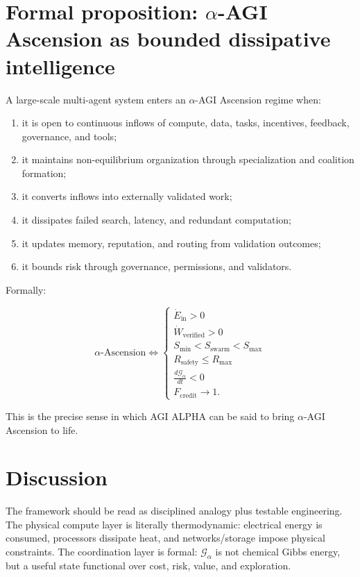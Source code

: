 \documentclass[
  11pt,
]{article}
\providecommand{\tightlist}{%
  \setlength{\itemsep}{0pt}\setlength{\parskip}{0pt}}
\begin{document}
\section{Formal proposition: \texorpdfstring{$\alpha$}{alpha}-AGI Ascension as bounded dissipative
intelligence}\label{formal-proposition-alpha-agi-ascension-as-bounded-dissipative-intelligence}

A large-scale multi-agent system enters an $\alpha$-AGI Ascension regime when:

\begin{enumerate}
\def\labelenumi{\arabic{enumi}.}
\tightlist
\item
  it is open to continuous inflows of compute, data, tasks, incentives,
  feedback, governance, and tools;
\item
  it maintains non-equilibrium organization through specialization and
  coalition formation;
\item
  it converts inflows into externally validated work;
\item
  it dissipates failed search, latency, and redundant computation;
\item
  it updates memory, reputation, and routing from validation outcomes;
\item
  it bounds risk through governance, permissions, and validators.
\end{enumerate}

Formally:

\[
\alpha\text{-Ascension}
\iff
\begin{cases}
\dot{E}_{\text{in}}>0 \\
\dot{W}_{\text{verified}}>0 \\
S_{\min}<S_{\text{swarm}}<S_{\max} \\
R_{\text{safety}}\leq R_{\max} \\
\frac{d\mathcal{G}_{\alpha}}{dt}<0 \\
F_{\text{credit}}\rightarrow 1.
\end{cases}
\]

This is the precise sense in which AGI ALPHA can be said to bring $\alpha$-AGI
Ascension to life.

\section{Discussion}\label{discussion}

The framework should be read as disciplined analogy plus testable
engineering. The physical compute layer is literally thermodynamic:
electrical energy is consumed, processors dissipate heat, and
networks/storage impose physical constraints. The coordination layer is
formal: \(\mathcal{G}_{\alpha}\) is not chemical Gibbs energy, but a
useful state functional over cost, risk, value, and exploration.
\end{document}
